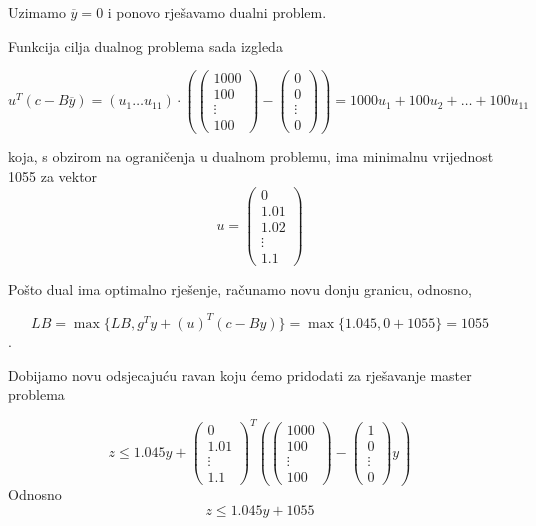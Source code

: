 \documentclass[a4paper, utf8, 11pt, colorlinks]{book}
\begin{document}
Uzimamo $\overline{y}=0$ i ponovo rješavamo dualni problem.

Funkcija cilja dualnog problema sada izgleda 

 $$
u^T (c-B\overline{y})=(u_1\ldots u_{11})\cdot \left(\left(\begin{array}{c}
	1000 \\
	100 \\
	\vdots \\
	100
\end{array}\right)-\left(\begin{array}{c}
	0 \\
	0 \\
	\vdots \\
	0
\end{array}\right)\right) =1000u_1+ 100u_2+\ldots+100u_{11}
$$

koja, s obzirom na ograničenja u dualnom problemu, ima minimalnu vrijednost 1055 za vektor $$u=\left(\begin{array}{c}
	0\\
	1.01 \\
	1.02 \\
	\vdots \\
	1.1
\end{array}\right)$$

Pošto dual ima optimalno rješenje, računamo novu donju granicu, odnosno,


$$LB = \max\{LB,g^Ty+(u)^T(c-By)\}=\max\{1.045,0+ 1055\} = 1055$$.

Dobijamo novu odsjecajuću ravan koju ćemo pridodati za rješavanje master problema

$$z\leqslant 1.045y+\left(\begin{array}{c}
	0\\
	1.01 \\
	\vdots \\
	1.1
\end{array}\right)^T
\left(\left(\begin{array}{c}
	1000 \\
	100 \\
	\vdots \\
	100
\end{array}\right)-\left(\begin{array}{c}
	1 \\
	0 \\
	\vdots \\
	0
\end{array}\right)y\right)$$
Odnosno 
$$z\leqslant 1.045y+1055$$
\end{document}
